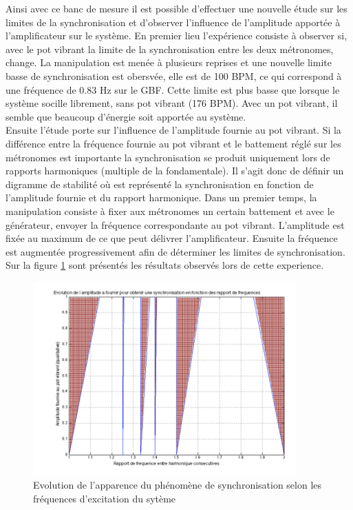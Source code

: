 \documentclass[a4paper,11pt]{report}
\begin{document}
Ainsi avec ce banc de mesure il est possible d'effectuer une nouvelle étude sur les limites de la synchronisation et d'observer l'influence de l'amplitude apportée à l'amplificateur sur le système. En premier lieu l'expérience consiste à observer si, avec le pot vibrant la limite de la synchronisation entre les deux métronomes, change. La manipulation est menée à plusieurs reprises et une nouvelle limite basse de synchronisation est obersvée, elle est de 100 BPM, ce qui correspond à une fréquence de 0.83 Hz sur le GBF. Cette limite est plus basse que lorsque le système socille librement, sans pot vibrant (176 BPM). Avec un pot vibrant, il semble que beaucoup d'énergie soit apportée au système.\\

Ensuite l'étude porte sur l'influence de l'amplitude fournie au pot vibrant. Si la différence entre la fréquence fournie au pot vibrant et le battement réglé sur les métronomes est importante la synchronisation se produit uniquement lors de rapports harmoniques (multiple de la fondamentale). Il s'agit donc de définir un digramme de stabilité où est représenté la synchronisation en fonction de l'amplitude fournie et du rapport harmonique. Dans un premier temps, la manipulation consiste à fixer aux métronomes un certain battement et avec le générateur, envoyer la fréquence correspondante au pot vibrant. L'amplitude est fixée au maximum de ce que peut délivrer l'amplificateur. Ensuite la fréquence est augmentée progressivement afin de déterminer les limites de synchronisation. Sur la figure \ref{ArnoldE} sont présentés les résultats observés lors de cette experience.
\begin{figure}[h]
\centering
\includegraphics[width=0.9\textwidth]{Arnold_tongues_exp_trait}
\caption{Evolution de l'apparence du phénomène de synchronisation selon les fréquences d'excitation du sytème}\label{ArnoldE}
\end{figure}\\
\end{document}
